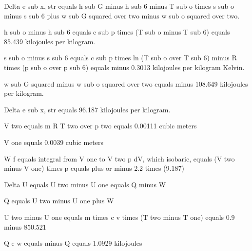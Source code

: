 Delta e sub x, str equals h sub G minus h sub 6 minus T sub o times s sub o minus s sub 6 plus w sub G squared over two minus w sub o squared over two. 

h sub o minus h sub 6 equals c sub p times (T sub o minus T sub 6) equals 85.439 kilojoules per kilogram. 

s sub o minus s sub 6 equals c sub p times ln (T sub o over T sub 6) minus R times (p sub o over p sub 6) equals minus 0.3013 kilojoules per kilogram Kelvin. 

w sub G squared minus w sub o squared over two equals minus 108.649 kilojoules per kilogram. 

Delta e sub x, str equals 96.187 kilojoules per kilogram.

V two equals m R T two over p two equals 0.00111 cubic meters

V one equals 0.0039 cubic meters

W f equals integral from V one to V two p dV, which isobaric, equals (V two minus V one) times p equals plus or minus 2.2 times (9.187)

Delta U equals U two minus U one equals Q minus W

Q equals U two minus U one plus W

U two minus U one equals m times c v times (T two minus T one) equals 0.9 minus 850.521

Q e w equals minus Q equals 1.0929 kilojoules